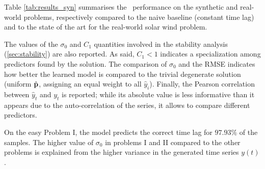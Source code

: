 Table \ref{tab:results_syn} summarises the \XX\ performance on the synthetic and real-world 
problems, respectively compared to the naive baseline (constant time lag) and to the state of the 
art for the real-world solar wind problem. 

The values of the $\sigma_0$ and $C_1$ quantities involved in the stability analysis 
(\cref{sec:stability}) are also reported. As said, $C_1 < 1$ indicates a specialization 
among predictors found by the solution. The comparison of $\sigma_0$ and the RMSE indicates how 
better the learned model is compared to the trivial degenerate solution (uniform $\hat {\bf p}$, 
assigning an equal weight to all $\hat y_i$). Finally, the Pearson correlation between 
$\hat y_t$ and $y_t$ is reported; while its absolute value is less informative than it appears due 
to the auto-correlation of the series, it allows to compare different predictors. 

\begin{table}
  \caption{Performance: \XX  \ / Base Line / \XX  \ Time Lag Prediction}\label{tab:results_syn}
  \centering
\end{table}

On the easy Problem I, the model predicts the correct time lag for $97.93\%$ of 
the samples. The higher value of $\sigma_0$ in problems I and II compared to 
the other problems is explained from the higher variance in the generated 
time series $y(t)$. 

